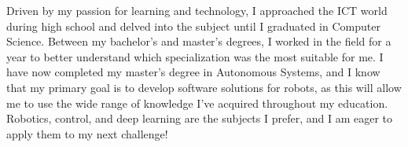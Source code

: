 \documentclass[11 pt,oneside,a4paper,titlepage]{article}
\begin{document}
{\begin{minipage}{7.3cm}
        Driven by my passion for learning and technology, I approached the ICT world during high school and delved into the subject until I graduated in Computer Science. Between my bachelor's and master's degrees, I worked in the field for a year to better understand which specialization was the most suitable for me.
        I have now completed my master's degree in Autonomous Systems, and I know that my primary goal is to develop software solutions for robots, as this will allow me to use the wide range of knowledge I've acquired throughout my education.
        Robotics, control, and deep learning are the subjects I prefer, and I am eager to apply them to my next challenge!

        \vspace*{0.18cm}


\end{minipage}}
\end{document}
